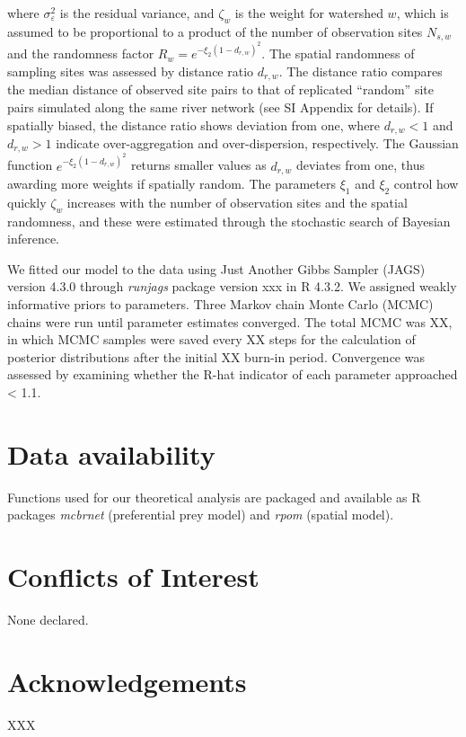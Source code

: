 \documentclass[11pt, class=article, crop=false]{standalone}
\begin{document}
where $\sigma_{\varepsilon}^2$ is the residual variance, and $\zeta_w$ is the weight for watershed $w$, which is assumed to be proportional to a product of the number of observation sites $N_{s,w}$ and the randomness factor $R_w = e^{-\xi_2 (1 - d_{r,w})^2}$.
The spatial randomness of sampling sites was assessed by distance ratio $d_{r, w}$.
The distance ratio compares the median distance of observed site pairs to that of replicated ``random'' site pairs simulated along the same river network (see SI Appendix for details).
If spatially biased, the distance ratio shows deviation from one, where $d_{r, w} < 1$ and $d_{r, w} > 1$ indicate over-aggregation and over-dispersion, respectively.
The Gaussian function $e^{-\xi_2 (1 - d_{r,w})^2}$ returns smaller values as $d_{r, w}$ deviates from one, thus awarding more weights if spatially random.
The parameters $\xi_1$ and $\xi_2$ control how quickly $\zeta_w$ increases with the number of observation sites and the spatial randomness, and these were estimated through the stochastic search of Bayesian inference.

We fitted our model to the data using Just Another Gibbs Sampler (JAGS) version 4.3.0 through \textit{runjags} package version xxx in R 4.3.2.
We assigned weakly informative priors to parameters.
Three Markov chain Monte Carlo (MCMC) chains were run until parameter estimates
converged.
The total MCMC was XX, in which MCMC samples were saved every XX steps for the calculation of posterior distributions after the initial XX burn-in period. 
Convergence was assessed by examining whether the R-hat indicator of each parameter approached < 1.1.

\section{Data availability}

Functions used for our theoretical analysis are packaged and available as R packages \textit{mcbrnet} (preferential prey model) and \textit{rpom} (spatial model).

\section{Conflicts of Interest}

None declared.

\section{Acknowledgements}

XXX


\end{document}
